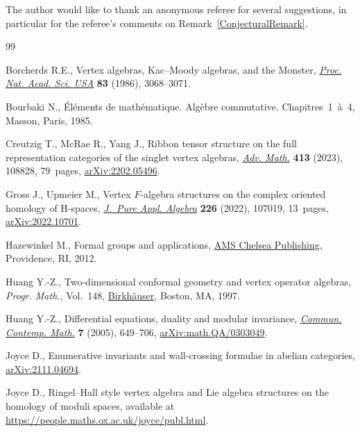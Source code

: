 \documentclass[pdftex]{sigma}
\numberwithin{equation}{section}
\theoremstyle{definition}
\begin{document}
The author would like to thank an anonymous referee for several suggestions, in particular for the referee's comments on Remark~\ref{ConjecturalRemark}.

\begin{thebibliography}{99}
\footnotesize\itemsep=0pt

Borcherds R.E., Vertex algebras, {K}ac--{M}oody algebras, and the {M}onster,
 \href{https://doi.org/10.1073/pnas.83.10.3068}{\textit{Proc. Nat. Acad. Sci.
 USA}} \textbf{83} (1986), 3068--3071.

Bourbaki N., {\'{E}}l\'ements de math\'ematique. Alg\`ebre commutative.
 {C}hapitres~1~\`a~4, Masson, Paris, 1985.

Creutzig T., McRae R., Yang J., Ribbon tensor structure on the full
 representation categories of the singlet vertex algebras,
 \href{https://doi.org/10.1016/j.aim.2022.108828}{\textit{Adv. Math.}}
 \textbf{413} (2023), 108828, 79~pages,
 \href{http://arxiv.org/abs/2202.05496}{arXiv:2202.05496}.

Gross J., Upmeier M., Vertex {$F$}-algebra structures on the complex oriented
 homology of {H}-spaces,
 \href{https://doi.org/10.1016/j.jpaa.2022.107019}{\textit{J.~Pure Appl.
 Algebra}} \textbf{226} (2022), 107019, 13~pages,
 \href{http://arxiv.org/abs/2022.10701}{arXiv:2022.10701}.

Hazewinkel M., Formal groups and applications,
 \href{https://doi.org/10.1090/chel/375}{AMS Chelsea Publishing}, Providence,
 RI, 2012.

Huang Y.-Z., Two-dimensional conformal geometry and vertex operator algebras,
 \textit{Progr. Math.}, Vol.~148,
 \href{https://doi.org/10.1007/978-1-4612-4276-5}{Birkh\"auser}, Boston, MA,
 1997.

Huang Y.-Z., Differential equations, duality and modular invariance,
 \href{https://doi.org/10.1142/S021919970500191X}{\textit{Commun. Contemp.
 Math.}} \textbf{7} (2005), 649--706,
 \href{http://arxiv.org/abs/math.QA/0303049}{arXiv:math.QA/0303049}.

Joyce D., Enumerative invariants and wall-crossing formulae in abelian
 categories, \href{http://arxiv.org/abs/2111.04694}{arXiv:2111.04694}.

Joyce D., Ringel--{H}all style vertex algebra and {L}ie algebra structures on
 the homology of moduli spaces, available at
 \url{https://people.maths.ox.ac.uk/joyce/publ.html}.


\end{thebibliography}
\end{document}
